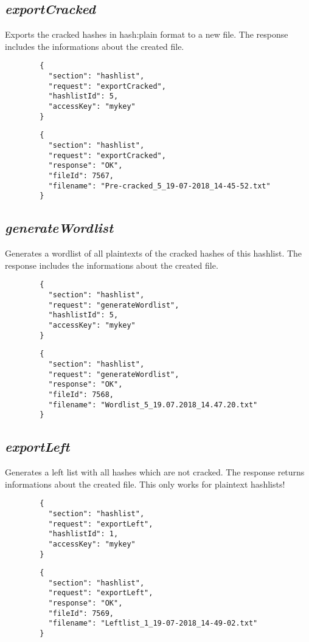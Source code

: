 \subsection*{\textit{exportCracked}}
	Exports the cracked hashes in hash:plain format to a new file. The response includes the informations about the created file.
	{
		\color{blue}
		\begin{verbatim}
		{
		  "section": "hashlist",
		  "request": "exportCracked",
		  "hashlistId": 5,
		  "accessKey": "mykey"
		}
		\end{verbatim}
	}
	{
		\color{OliveGreen}
		\begin{verbatim}
		{
		  "section": "hashlist",
		  "request": "exportCracked",
		  "response": "OK",
		  "fileId": 7567,
		  "filename": "Pre-cracked_5_19-07-2018_14-45-52.txt"
		}
		\end{verbatim}
	}
\subsection*{\textit{generateWordlist}}
	Generates a wordlist of all plaintexts of the cracked hashes of this hashlist. The response includes the informations about the created file.
	{
		\color{blue}
		\begin{verbatim}
		{
		  "section": "hashlist",
		  "request": "generateWordlist",
		  "hashlistId": 5,
		  "accessKey": "mykey"
		}
		\end{verbatim}
	}
	{
		\color{OliveGreen}
		\begin{verbatim}
		{
		  "section": "hashlist",
		  "request": "generateWordlist",
		  "response": "OK",
		  "fileId": 7568,
		  "filename": "Wordlist_5_19.07.2018_14.47.20.txt"
		}
		\end{verbatim}
	}
\subsection*{\textit{exportLeft}}
	Generates a left list with all hashes which are not cracked. The response returns informations about the created file. This only works for plaintext hashlists!
	{
		\color{blue}
		\begin{verbatim}
		{
		  "section": "hashlist",
		  "request": "exportLeft",
		  "hashlistId": 1,
		  "accessKey": "mykey"
		}
		\end{verbatim}
	}
	{
		\color{OliveGreen}
		\begin{verbatim}
		{
		  "section": "hashlist",
		  "request": "exportLeft",
		  "response": "OK",
		  "fileId": 7569,
		  "filename": "Leftlist_1_19-07-2018_14-49-02.txt"
		}
		\end{verbatim}
	}
